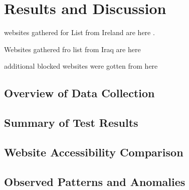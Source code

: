 \chapter{Results and Discussion}

websites gathered for List from Ireland are here \cite{top50irishwebsites}.

Websites gathered fro list from Iraq are here \cite{top50IraqWebsites}

additional blocked websites were gotten from here \cite{blocksiteMostBlocked}

\section{Overview of Data Collection}

\section{Summary of Test Results}

\section{Website Accessibility Comparison}

\section{Observed Patterns and Anomalies}


